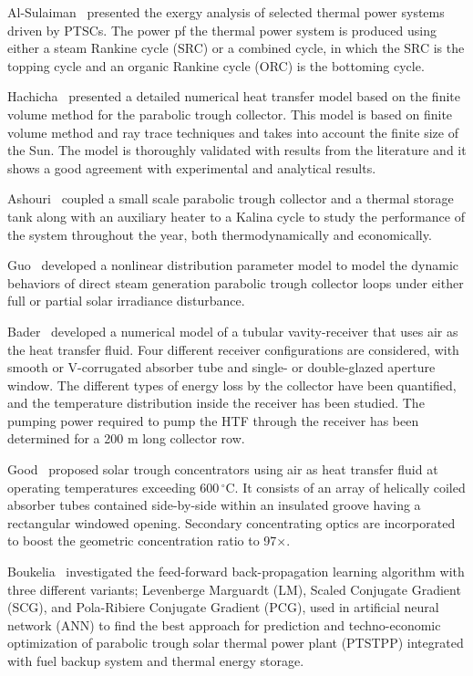 Al-Sulaiman~\cite{AlSulaiman2014} presented the exergy analysis of selected thermal power systems driven by PTSCs. The power pf the thermal power system is produced using either a steam Rankine cycle (SRC) or a combined cycle, in which the SRC is the topping cycle and an organic Rankine cycle (ORC) is the bottoming cycle.

Hachicha~\cite{Hachicha2013} presented a detailed numerical heat transfer model based on the finite volume method for the parabolic trough collector.  This model is based on finite volume method and ray trace techniques and takes into account the finite size of the Sun.  The model is thoroughly validated with results from the literature and it shows a good agreement with experimental and analytical results.

Ashouri~\cite{Ashouri2015} coupled a small scale parabolic trough collector and a thermal storage tank along with an auxiliary heater to a Kalina cycle to study the performance of the system throughout the year, both thermodynamically and economically.

Guo~\cite{SuGuo2016} developed a nonlinear distribution parameter model to model the dynamic behaviors of direct steam generation parabolic trough collector loops under either full or partial solar irradiance disturbance.

Bader~\cite{Bader2015} developed a numerical model of a tubular vavity-receiver that uses air as the heat transfer fluid. Four different receiver configurations are considered, with smooth or V-corrugated absorber tube and single- or double-glazed aperture window. The different types of energy loss by the collector have been quantified, and the temperature distribution inside the receiver has been studied. The pumping power required to pump the HTF through the receiver has been determined for a 200 m long collector row.

Good~\cite{Good2015} proposed solar trough concentrators using air as heat transfer fluid at operating temperatures exceeding $600\,^\circ$C. It consists of an array of helically coiled absorber tubes contained side-by-side within an insulated groove having a rectangular windowed opening. Secondary concentrating optics are incorporated to boost the geometric concentration ratio to 97$\times$.

Boukelia~\cite{Boukelia2016} investigated the feed-forward back-propagation learning algorithm with three different variants; Levenberge Marguardt (LM), Scaled Conjugate Gradient (SCG), and Pola-Ribiere Conjugate Gradient (PCG), used in artificial neural network (ANN) to find the best approach for prediction and techno-economic optimization of parabolic trough solar thermal power plant (PTSTPP) integrated with fuel backup system and thermal energy storage.

